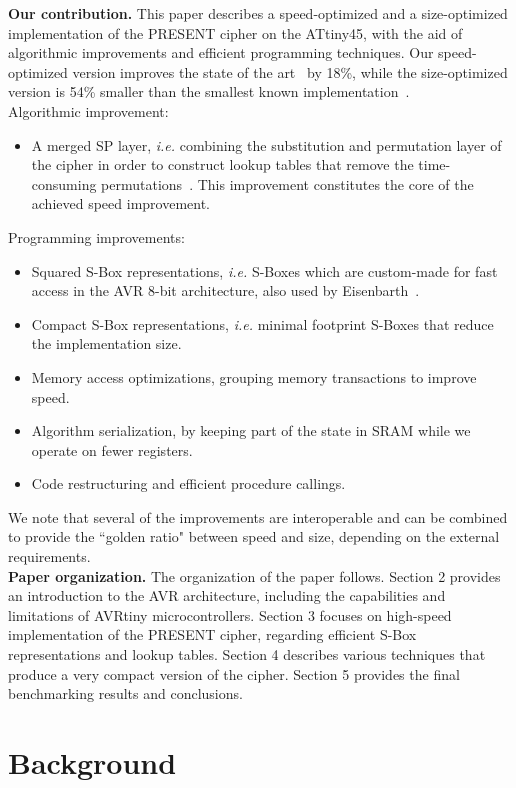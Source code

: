 \documentclass[11pt]{article}
\begin{document}
\textbf{Our contribution.} This paper describes a speed-optimized and a size-optimized implementation of the PRESENT cipher on the ATtiny45, with the aid of algorithmic improvements and efficient programming techniques. Our speed-optimized version improves the state of the art~\cite{eisenbarth2012compact} by 18\%, while the size-optimized version is 54\% smaller than the smallest known implementation~\cite{eisenbarth2012compact}.\\
Algorithmic improvement:
\begin{itemize}[nolistsep]
  \item A merged SP layer, \emph{i.e.} combining the substitution and permutation layer of the cipher in order to construct lookup tables that remove the time-consuming permutations~\cite{gong_code}. This improvement constitutes the core of the achieved speed improvement.
\end{itemize}
Programming improvements:
\begin{itemize}[nolistsep]
  \item Squared S-Box representations, \emph{i.e.} S-Boxes which are custom-made for fast access in the AVR 8-bit architecture, also used by Eisenbarth~\cite{eisenbarth2012compact}.
  \item Compact S-Box representations, \emph{i.e.} minimal footprint S-Boxes that reduce the implementation size.
  \item Memory access optimizations, grouping memory transactions to improve speed.
  \item Algorithm serialization, by keeping part of the state in SRAM while we operate on fewer registers.
  \item Code restructuring and efficient procedure callings.
\end{itemize}
We note that several of the improvements are interoperable and can be combined to provide the ``golden ratio" between speed and size, depending on the external requirements.\\
\textbf{Paper organization.} The organization of the paper follows. Section 2 provides an introduction to the AVR architecture, including the capabilities and limitations of AVRtiny microcontrollers. Section 3 focuses on high-speed implementation of the PRESENT cipher, regarding efficient S-Box representations and lookup tables. Section 4 describes various techniques that produce a very compact version of the cipher. Section 5 provides the final benchmarking results and conclusions.

\section{Background}
\end{document}
